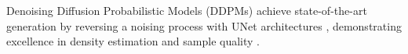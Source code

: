 \vspace{3pt}  
% 
Denoising Diffusion Probabilistic Models (DDPMs) \cite{sohl2015deep} achieve state-of-the-art generation by reversing a noising process with UNet architectures \cite{ronneberger2015u}, demonstrating excellence in density estimation and sample quality \cite{kingma2021variational, dhariwal2021diffusion}.
